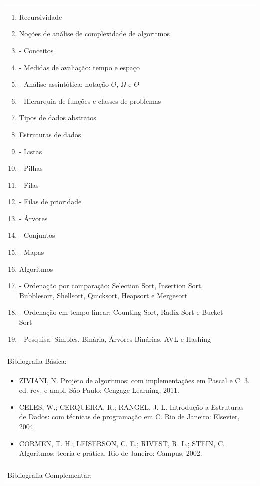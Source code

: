 \documentclass[11pt]{article}
\begin{document}
\begin{center}
\begin{longtable}{|p{4cm}|p{4cm}|p{4cm}|p{4cm}|}
{\begin{enumerate}
\item Recursividade
\item Noções de análise de complexidade de algoritmos
\item  -  Conceitos
\item  -  Medidas de avaliação: tempo e espaço
\item  - Análise assintótica: notação $O$, $\Omega$ e $\Theta$
\item  -  Hierarquia de funções e classes de problemas
\item Tipos de dados abstratos
\item Estruturas de dados
\item  - Listas
\item  - Pilhas
\item  - Filas
\item  - Filas de prioridade
\item  - Árvores
\item  - Conjuntos
\item  - Mapas
\item Algoritmos
\item  - Ordenação por comparação: Selection Sort, Insertion Sort, Bubblesort, Shellsort, Quicksort, Heapsort e Mergesort
\item  - Ordenação em tempo linear: Counting Sort, Radix Sort e Bucket Sort
\item  - Pesquisa: Simples, Binária, Árvores Binárias, AVL e Hashing\end{enumerate}}\\
\multicolumn{4}{|p{16cm}|}{}\\
\hline
\multicolumn{4}{|p{16cm}|}{Bibliografia Básica:}\\
\multicolumn{4}{|p{16cm}|}{%
\begin{itemize}\item ZIVIANI, N. Projeto de algoritmos: com implementações em Pascal e C. 3. ed. rev. e ampl. São Paulo: Cengage Learning, 2011.
\item CELES, W.; CERQUEIRA, R.; RANGEL, J. L. Introdução a Estruturas de Dados: com técnicas de programação em C. Rio de Janeiro: Elsevier, 2004.
\item CORMEN, T. H.; LEISERSON, C. E.; RIVEST, R. L.; STEIN, C. Algoritmos: teoria e prática. Rio de Janeiro: Campus, 2002.\end{itemize}}\\
\multicolumn{4}{|p{16cm}|}{}\\
\hline
\multicolumn{4}{|p{16cm}|}{Bibliografia Complementar:}\\

\end{longtable}
\end{center}
\end{document}

